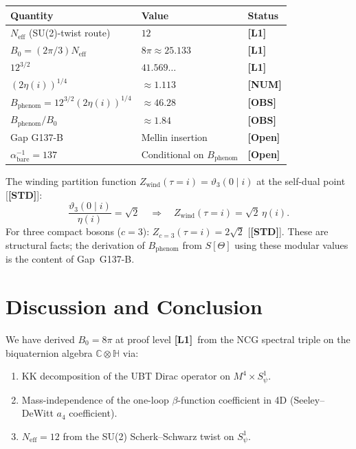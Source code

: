 \documentclass[12pt,a4paper]{article}
\theoremstyle{definition}
\theoremstyle{remark}
\newcommand{\OPEN}{\textbf{[Open]}}
\newcommand{\Lone}{\textbf{[L1]}}
\newcommand{\STD}{\textbf{[STD]}}
\newcommand{\NUM}{\textbf{[NUM]}}
\newcommand{\OBS}{\textbf{[OBS]}}
\newcommand{\Bq}{\mathbb{C}\otimes\mathbb{H}}
\newcommand{\Neff}{N_{\mathrm{eff}}}
\begin{document}
\begin{center}
\begin{tabular}{lll}
\toprule
\textbf{Quantity} & \textbf{Value} & \textbf{Status} \\
\midrule
$\Neff$ (SU(2)-twist route) & $12$ & \Lone \\
$B_0 = (2\pi/3)\Neff$ & $8\pi \approx 25.133$ & \Lone \\
$12^{3/2}$ & $41.569\ldots$ & \Lone \\
$(2\eta(i))^{1/4}$ & $\approx 1.113$ & \NUM \\
$B_{\mathrm{phenom}} = 12^{3/2}(2\eta(i))^{1/4}$ & $\approx 46.28$ & \OBS \\
$B_{\mathrm{phenom}}/B_0$ & $\approx 1.84$ & \OBS \\
\midrule
Gap G137-B & Mellin insertion & \OPEN \\
$\alpha^{-1}_{\mathrm{bare}} = 137$ & Conditional on $B_{\mathrm{phenom}}$ & \OPEN \\
\bottomrule
\end{tabular}
\end{center}

The winding partition function $Z_{\mathrm{wind}}(\tau=i)=\vartheta_3(0\mid i)$
at the self-dual point [\STD]:
\[
\frac{\vartheta_3(0\mid i)}{\eta(i)} = \sqrt{2}
\quad\Longrightarrow\quad
Z_{\mathrm{wind}}(\tau=i) = \sqrt{2}\,\eta(i).
\]
For three compact bosons ($c=3$): $Z_{c=3}(\tau=i)=2\sqrt{2}$ [\STD].
These are structural facts; the derivation of $B_{\mathrm{phenom}}$ from
$S[\Theta]$ using these modular values is the content of Gap~G137-B.

\section{Discussion and Conclusion}
\label{sec:conclusion}

We have derived $B_0 = 8\pi$ at proof level \Lone\ from the NCG spectral
triple on the biquaternion algebra $\Bq$ via:

\begin{enumerate}[label=(\arabic*)]
\item KK decomposition of the UBT Dirac operator on $M^4\times S^1_\psi$.
\item Mass-independence of the one-loop $\beta$-function coefficient in 4D
  (Seeley--DeWitt $a_4$ coefficient).
\item $\Neff = 12$ from the SU(2) Scherk--Schwarz twist on $S^1_\psi$.
\end{enumerate}
\end{document}
